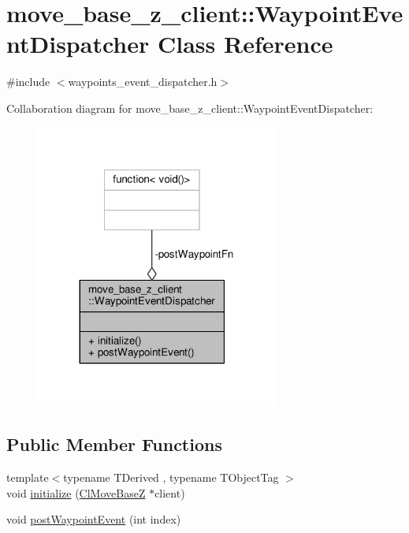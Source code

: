 \hypertarget{classmove__base__z__client_1_1WaypointEventDispatcher}{}\section{move\+\_\+base\+\_\+z\+\_\+client\+:\+:Waypoint\+Event\+Dispatcher Class Reference}
\label{classmove__base__z__client_1_1WaypointEventDispatcher}


{\ttfamily \#include $<$waypoints\+\_\+event\+\_\+dispatcher.\+h$>$}



Collaboration diagram for move\+\_\+base\+\_\+z\+\_\+client\+:\+:Waypoint\+Event\+Dispatcher\+:\nopagebreak
\begin{figure}[H]
\begin{center}
\leavevmode
\includegraphics[width=227pt]{classmove__base__z__client_1_1WaypointEventDispatcher__coll__graph}
\end{center}
\end{figure}
\subsection*{Public Member Functions}
\begin{DoxyCompactItemize}
\item 
{\footnotesize template$<$typename T\+Derived , typename T\+Object\+Tag $>$ }\\void \hyperlink{classmove__base__z__client_1_1WaypointEventDispatcher_a70fc3a92c59e40648f350f3912d736ae}{initialize} (\hyperlink{classmove__base__z__client_1_1ClMoveBaseZ}{Cl\+Move\+BaseZ} $\ast$client)
\item 
void \hyperlink{classmove__base__z__client_1_1WaypointEventDispatcher_a7421f1eb8aae15a3ddde7c50bea87648}{post\+Waypoint\+Event} (int index)
\end{DoxyCompactItemize}
